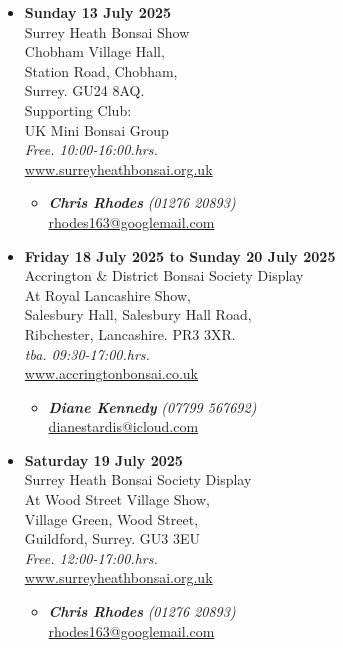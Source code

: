 \begin{itemize}
    \item \textbf{Sunday 13 July 2025}
    \\
    Surrey Heath Bonsai Show \\
    Chobham Village Hall, \\
    Station Road, Chobham, \\
    Surrey. GU24 8AQ. \\
    Supporting Club: \\
    UK Mini Bonsai Group
    \\
    \emph{Free. 10:00-16:00.hrs.}
    \\
    \href{https://www.surreyheathbonsai.org.uk}{www.surreyheathbonsai.org.uk}
    \begin{itemize}
        \item \textbf{\emph{Chris Rhodes}} \emph{(01276 20893)} \\
        \href{mailto:rhodes163@googlemail.com}{rhodes163@googlemail.com} 
    \end{itemize}

    \item \textbf{Friday 18 July 2025 to Sunday 20 July 2025}
    \\
    Accrington \& District Bonsai Society Display \\
    At Royal Lancashire Show, \\
    Salesbury Hall, Salesbury Hall Road, \\
    Ribchester, Lancashire. PR3 3XR.
    \\
    \emph{tba. 09:30-17:00.hrs.}
    \\
    \href{https://www.accringtonbonsai.co.uk}{www.accringtonbonsai.co.uk}
    \begin{itemize}
        \item \textbf{\emph{Diane Kennedy}} \emph{(07799 567692)} \\
        \href{mailto:dianestardis@icloud.com}{dianestardis@icloud.com} 
    \end{itemize}

    \item \textbf{Saturday 19 July 2025}
    \\
    Surrey Heath Bonsai Society Display \\
    At Wood Street Village Show, \\
    Village Green, Wood Street, \\
    Guildford, Surrey. GU3 3EU
    \\
    \emph{Free. 12:00-17:00.hrs.}
    \\
    \href{https://www.surreyheathbonsai.org.uk}{www.surreyheathbonsai.org.uk}
    \begin{itemize}
        \item \textbf{\emph{Chris Rhodes}} \emph{(01276 20893)} \\
        \href{mailto:rhodes163@googlemail.com}{rhodes163@googlemail.com} 
    \end{itemize}


\end{itemize}

